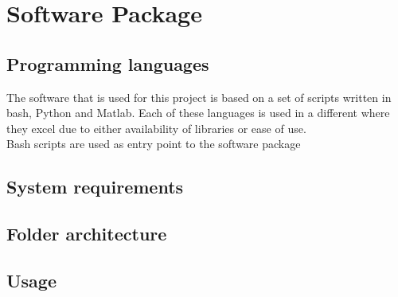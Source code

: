 
\chapter{Software Package}

\section{Programming languages}

The software that is used for this project is based on a set of scripts written in bash, Python and Matlab. Each of these languages is used in a different where they excel due to either availability of libraries or ease of use. \\

Bash scripts are used as entry point to the software package
 

\section{System requirements}
\section{Folder architecture}
\section{Usage}
